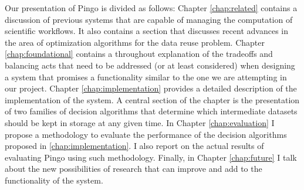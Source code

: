 Our presentation of Pingo is divided as follows: Chapter \ref{chap:related} contains a discussion of previous systems that are capable of managing the computation of scientific workflows.  It also contains a section that discusses recent advances in the area of optimization algorithms for the data reuse problem.  Chapter \ref{chap:foundational} contains a throughout explanation of the tradeoffs and balancing acts that need to be addressed (or at least considered) when designing a system that promises a functionality similar to the one we are attempting in our project.  Chapter \ref{chap:implementation} provides a detailed description of the implementation of the system.  A central section of the chapter is the presentation of two families of decision algorithms that determine which intermediate datasets should be kept in storage at any given time. In Chapter \ref{chap:evaluation} I propose a methodology to evaluate the performance of the decision algorithms proposed in \ref{chap:implementation}.  I also report on the actual results of evaluating Pingo using such methodology.  Finally, in Chapter \ref{chap:future} I talk about the new possibilities of research that can improve and add to the functionality of the system.